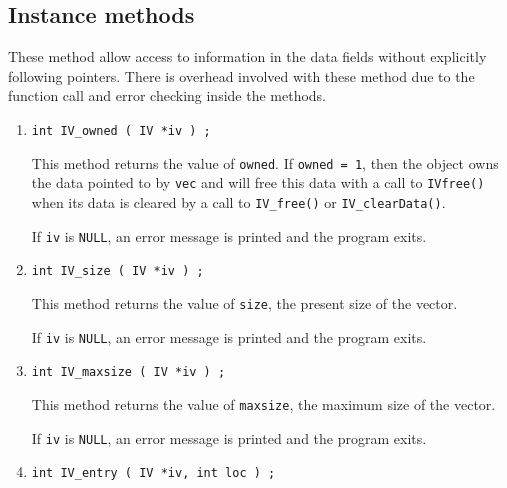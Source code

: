 \subsection{Instance methods}
\label{subsection:IV:proto:Instance}
\par
These method allow access to information in the data fields without
explicitly following pointers.
There is overhead involved with these method due to the function
call and error checking inside the methods.
\par
\begin{enumerate}
\item
\begin{verbatim}
int IV_owned ( IV *iv ) ;
\end{verbatim}
This method returns the value of {\tt owned}.
If {\tt owned = 1}, 
then the object owns the data pointed to by {\tt vec}
and will free this data with a call to {\tt IVfree()} when its data
is cleared by a call to {\tt IV\_free()} or {\tt IV\_clearData()}.
\par {}
If {\tt iv} is {\tt NULL},
an error message is printed and the program exits.
\item
\begin{verbatim}
int IV_size ( IV *iv ) ;
\end{verbatim}
This method returns the value of {\tt size},
the present size of the vector.
\par {}
If {\tt iv} is {\tt NULL},
an error message is printed and the program exits.
\item
\begin{verbatim}
int IV_maxsize ( IV *iv ) ;
\end{verbatim}
This method returns the value of {\tt maxsize},
the maximum size of the vector.
\par {}
If {\tt iv} is {\tt NULL},
an error message is printed and the program exits.
\item
\begin{verbatim}
int IV_entry ( IV *iv, int loc ) ;

\end{verbatim}
\end{enumerate}
